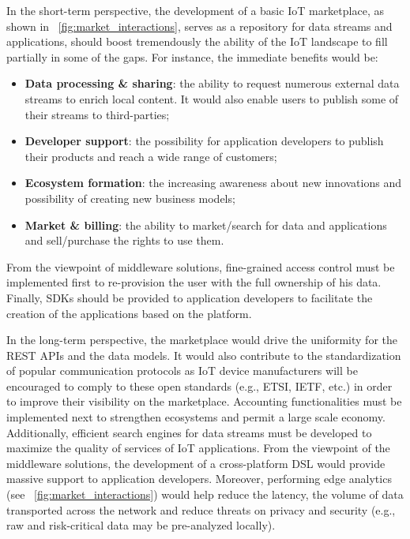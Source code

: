 \documentclass[preprint,10pt,5p]{elsarticle}
\begin{document}
In the short-term perspective, the development of a basic IoT marketplace, as shown in
\figurename{~\ref{fig:market_interactions}},
serves as a repository for data streams and applications, should boost
tremendously the ability of the IoT landscape to fill partially in some of the 
gaps.
For instance, the immediate benefits would be:
\begin{itemize}
 \item \textbf{Data processing \& sharing}: the ability to request numerous external
 data streams to enrich local content. It would also enable users to publish some
 of their streams to third-parties;
 \item \textbf{Developer support}: the possibility for application developers to
 publish their products and reach a wide range of customers;
 \item \textbf{Ecosystem formation}: the increasing awareness about
   new innovations and possibility of creating new business models;
 \item \textbf{Market \& billing}: the ability to market/search for data and
   applications and sell/purchase the rights to use them.
\end{itemize}

From the viewpoint of middleware solutions, fine-grained access control must be 
implemented first to re-provision the user with the full ownership of his data.
Finally, SDKs should be provided to application developers to facilitate the creation of
the applications based on the platform.

In the long-term perspective, the marketplace would drive the uniformity for the 
REST APIs and the data models. It would also contribute to the standardization of
popular communication protocols as IoT device manufacturers will be encouraged
to comply to these open standards (e.g., ETSI, IETF, etc.) in order to
improve their visibility on the marketplace. 
Accounting functionalities must be implemented next to
strengthen ecosystems and permit a large scale economy.
Additionally, efficient search engines for data streams must be
developed to maximize the quality of services of IoT applications.
From the viewpoint of the middleware solutions, the development of a 
cross-platform DSL would provide massive support to application 
developers. Moreover, performing edge analytics (see \figurename{~\ref{fig:market_interactions}})
would help reduce the latency, the volume of data transported across the network and 
reduce threats on privacy and security (e.g., raw and risk-critical data may be pre-analyzed locally).
\end{document}
